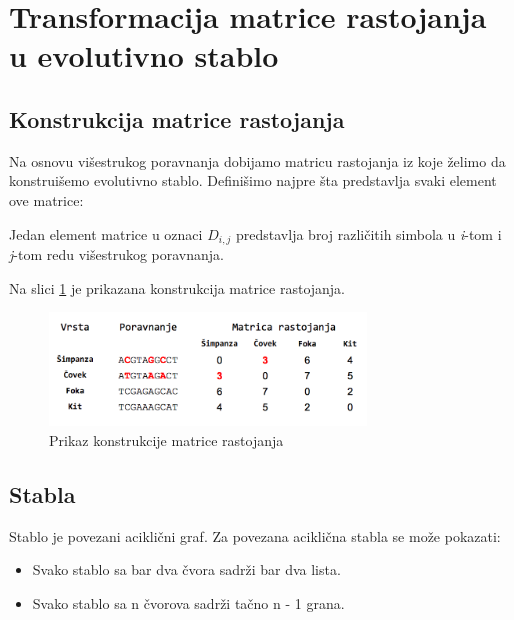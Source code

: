 \section{Transformacija matrice rastojanja u evolutivno stablo}
\label{sec:transformacijamatrice}

\subsection{Konstrukcija matrice rastojanja}
\label{subsec:matricarastojanja}

Na osnovu vi\v{s}estrukog poravnanja dobijamo matricu rastojanja iz koje \v{z}elimo da konstrui\v{s}emo evolutivno stablo.
Defini\v{s}imo najpre \v{s}ta predstavlja svaki element ove matrice:

\begin{definicija}
Jedan element matrice u oznaci $D_{i,j}$ predstavlja broj razli\v{c}itih simbola u \textit{i}-tom i \textit{j}-tom redu vi\v{s}estrukog poravnanja.
\end{definicija}

Na slici \ref{fig:pkmr} je prikazana konstrukcija matrice rastojanja.

\begin{figure}[h!]
\begin{center}
\includegraphics[width=0.75\textwidth]{poglavlja/7/slike/slika2.png}
\end{center}
\caption{Prikaz konstrukcije matrice rastojanja}
\label{fig:pkmr}
\end{figure}

\subsection{Stabla}
\label{subsec:stabla}

Stablo je povezani acikli\v{c}ni graf. Za povezana acikli\v{c}na stabla se mo\v{z}e pokazati:
\begin{itemize}
	\item Svako stablo sa bar dva \v{c}vora sadr\v{z}i bar dva lista.
	\item Svako stablo sa n \v{c}vorova sadr\v{z}i ta\v{c}no n - 1 grana.
\end{itemize}


